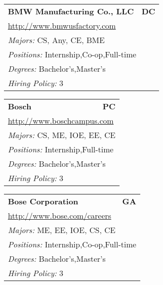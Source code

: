 \documentclass[twoside]{article}
\begin{document}
\begin{center}
\begin{multicols}{3}
\begin{FlushLeft}
\begin{minipage}{\columnwidth}
\end{minipage}
 
\begin{minipage}{\columnwidth}\begin{tabularx}{.95\columnwidth}{Xr}
                 {\Large\bf BMW Manufacturing Co., LLC} & {\Large\bf DC}\\
    \multicolumn{2}{p{.95\columnwidth}}{\url{http://www.bmwusfactory.com}}\\
    \multicolumn{2}{p{.95\columnwidth}}{\emph{Majors:} CS, Any, CE, BME}\\
    \multicolumn{2}{p{.95\columnwidth}}{\emph{Positions:} Internship,Co-op,Full-time}\\
    \multicolumn{2}{p{.95\columnwidth}}{\emph{Degrees:} Bachelor's,Master's}\\
    \multicolumn{2}{p{.95\columnwidth}}{\emph{Hiring Policy:} 3}\\
    \end{tabularx}
    
\end{minipage}
 
\begin{minipage}{\columnwidth}\begin{tabularx}{.95\columnwidth}{Xr}
                 {\Large\bf Bosch} & {\Large\bf PC}\\
    \multicolumn{2}{p{.95\columnwidth}}{\url{http://www.boschcampus.com}}\\
    \multicolumn{2}{p{.95\columnwidth}}{\emph{Majors:} CS, ME, IOE, EE, CE}\\
    \multicolumn{2}{p{.95\columnwidth}}{\emph{Positions:} Internship,Full-time}\\
    \multicolumn{2}{p{.95\columnwidth}}{\emph{Degrees:} Bachelor's,Master's}\\
    \multicolumn{2}{p{.95\columnwidth}}{\emph{Hiring Policy:} 3}\\
    \end{tabularx}
    
\end{minipage}
 
\begin{minipage}{\columnwidth}\begin{tabularx}{.95\columnwidth}{Xr}
                 {\Large\bf Bose Corporation} & {\Large\bf GA}\\
    \multicolumn{2}{p{.95\columnwidth}}{\url{http://www.bose.com/careers}}\\
    \multicolumn{2}{p{.95\columnwidth}}{\emph{Majors:} ME, EE, IOE, CS, CE}\\
    \multicolumn{2}{p{.95\columnwidth}}{\emph{Positions:} Internship,Co-op,Full-time}\\
    \multicolumn{2}{p{.95\columnwidth}}{\emph{Degrees:} Bachelor's,Master's}\\
    \multicolumn{2}{p{.95\columnwidth}}{\emph{Hiring Policy:} 3}\\
    \end{tabularx}
    

\end{minipage}
\end{FlushLeft}
\end{multicols}
\end{center}
\end{document}
